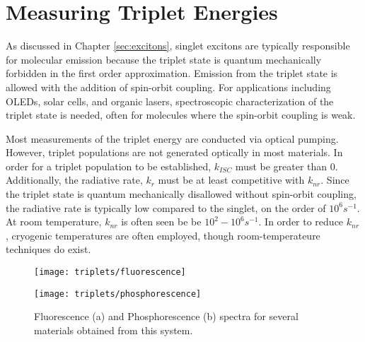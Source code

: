 \documentclass[../thesis.tex]{subfiles}
\begin{document}
\chapter{Measuring Triplet Energies}

As discussed in Chapter \ref{sec:excitons}, singlet excitons are typically responsible for molecular emission because the triplet state is quantum mechanically forbidden in the first order approximation.\supercite{Turro1991a}
Emission from the triplet state is allowed with the addition of spin-orbit coupling.\supercite{Baldo1998a}
For applications including OLEDs, solar cells, and organic lasers, spectroscopic characterization of the triplet state is needed, often for molecules where the spin-orbit coupling is weak.\supercite{Tokito2003a,Goushi2004d,Zhang2011a,Schueppel2007}

Most measurements of the triplet energy are conducted via optical pumping.\supercite{Turro1991a,Goushi2004d,Padhye1956,Holmes2003}
However, triplet populations are not generated optically in most materials.\supercite{Turro1991a}
In order for a triplet population to be established, $k_{ISC}$ must be greater than 0.
Additionally, the radiative rate, $k_r$ must be at least competitive with $k_{nr}$.
Since the triplet state is quantum mechanically disallowed without spin-orbit coupling, the radiative rate is typically low compared to the singlet, on the order of $10^6 s^{-1}$.
At room temperature, $k_{nr}$ is often seen be be $10^2-10^6 s^{-1}$.\supercite{Reineke2014}
In order to reduce $k_{nr}$, cryogenic temperatures are often employed, though room-temperateure techniques do exist.\supercite{Reineke2014}

\begin{wrapfigure}{r}{.5\textwidth}
    \begin{minipage}{\linewidth}
    \centering%
    \texttt{[image: triplets/fluorescence]}

    \texttt{[image: triplets/phosphorescence]}
\end{minipage}
\caption{Fluorescence (a) and Phosphorescence (b) spectra for several materials obtained from this system.}
\label{fig:triplets}
\end{wrapfigure}
\end{document}
